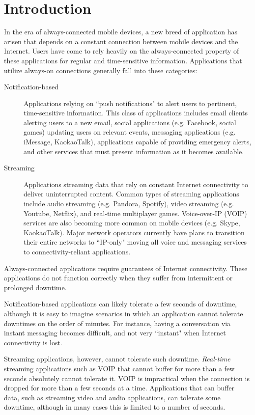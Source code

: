\section{Introduction}
\label{sec:intro}

In the era of always-connected mobile devices, a new breed of application has arisen that depends on a constant connection between mobile devices and the Internet. Users have come to rely heavily on the always-connected property of these applications for regular and time-sensitive information. Applications that utilize always-on connections generally fall into these categories:

\begin{description}
\item[Notification-based] Applications relying on ``push notifications" to alert users to pertinent, time-sensitive information. This class of applications includes email clients alerting users to a new email, social applications (e.g. Facebook, social games) updating users on relevant events, messaging applications (e.g. iMessage, KaokaoTalk), applications capable of providing emergency alerts, and other services that must present information as it becomes available.
\item[Streaming] Applications streaming data that rely on constant Internet connectivity to deliver uninterrupted content. Common types of streaming applications include audio streaming (e.g. Pandora, Spotify), video streaming (e.g. Youtube, Netflix), and real-time multiplayer games. Voice-over-IP (VOIP) services are also becoming more common on mobile devices (e.g. Skype, KaokaoTalk). Major network operators currently have plans to transition their entire networks to ``IP-only" \cite{ATT:2012} moving all voice and messaging services to connectivity-reliant applications.
\end{description}

Always-connected applications require guarantees of Internet connectivity. These applications do not function correctly when they suffer from intermittent or prolonged downtime.

Notification-based applications can likely tolerate a few seconds of downtime, although it is easy to imagine scenarios in which an application cannot tolerate downtimes on the order of minutes. For instance, having a conversation via instant messaging becomes difficult, and not very ``instant" when Internet connectivity is lost.

Streaming applications, however, cannot tolerate such downtime. \emph{Real-time} streaming applications such as VOIP that cannot buffer for more than a few seconds absolutely cannot tolerate it. VOIP is impractical when the connection is dropped for more than a few seconds at a time. Applications that can buffer data, such as streaming video and audio applications, can tolerate some downtime, although in many cases this is limited to a number of seconds.

